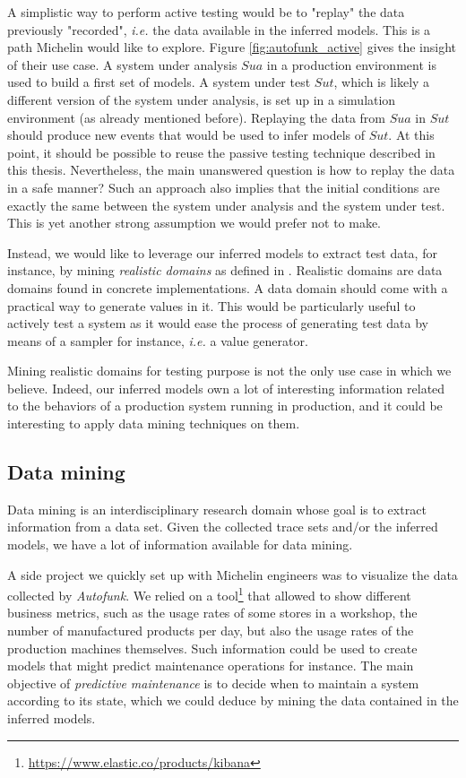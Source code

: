 A simplistic way to perform active testing would be to "replay"
the data previously "recorded", \emph{i.e.} the data available in the
inferred models. This is a path Michelin would like to explore.
Figure \ref{fig:autofunk_active} gives the insight of their use
case. A system under analysis $\mathit{Sua}$ in a production environment
is used to build a first set of models. A system under test
$\mathit{Sut}$, which is likely a different version of the system under
analysis, is set up in a simulation environment (as already
mentioned before). Replaying the data from $\mathit{Sua}$ in $\mathit{Sut}$ should
produce new events that would be used to infer models of $\mathit{Sut}$.
At this point, it should be possible to reuse the passive testing
technique described in this thesis. Nevertheless, the main
unanswered question is how to replay the data in a safe manner?
Such an approach also implies that the initial conditions are
exactly the same between the system under analysis and the system
under test. This is yet another strong assumption we would prefer
not to make.

Instead, we would like to leverage our inferred models to extract
test data, for instance, by mining \emph{realistic domains} as
defined in \cite{Enderlin:2011:PSL:2075545.2075551}. Realistic
domains are data domains found in concrete implementations. A
data domain should come with a practical way to generate values
in it. This would be particularly useful to actively test a
system as it would ease the process of generating test data by
means of a sampler for instance, \emph{i.e.} a value generator.

Mining realistic domains for testing purpose is not the only use
case in which we believe. Indeed, our inferred models own a lot
of interesting information related to the behaviors of a
production system running in production, and it could be
interesting to apply data mining techniques on them.

\subsection{Data mining}
\label{sec:conclusion:testing:data}

Data mining \cite{chakrabarti2006data} is an interdisciplinary
research domain whose goal is to extract information from a data
set. Given the collected trace sets and/or the inferred models,
we have a lot of information available for data mining.

A side project we quickly set up with Michelin engineers was to
visualize the data collected by \textit{Autofunk}. We relied on a
tool\footnote{\url{https://www.elastic.co/products/kibana}} that
allowed to show different business metrics, such as the usage
rates of some stores in a workshop, the number of manufactured
products per day, but also the usage rates of the production
machines themselves. Such information could be used to create
models that might predict maintenance operations for instance.
The main objective of \emph{predictive maintenance}
\cite{mobley2002introduction} is to decide when to maintain a
system according to its state, which we could deduce by mining
the data contained in the inferred models.

